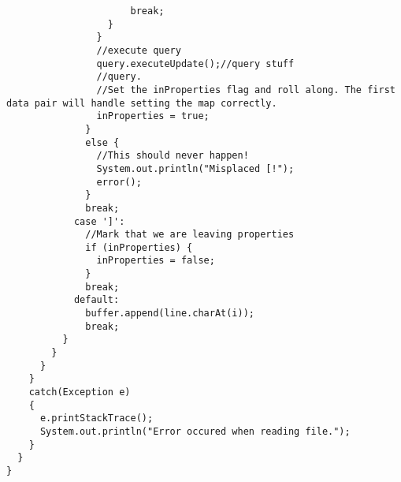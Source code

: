 \begin{lstlisting}
                      break;
                  }
                }
                //execute query
                query.executeUpdate();//query stuff
                //query.
                //Set the inProperties flag and roll along. The first data pair will handle setting the map correctly.
                inProperties = true;
              }
              else {
                //This should never happen!
                System.out.println("Misplaced [!");
                error();
              }
              break;
            case ']':
              //Mark that we are leaving properties
              if (inProperties) {
                inProperties = false;
              }
              break;
            default:
              buffer.append(line.charAt(i));
              break;
          }
        }
      }
    }
    catch(Exception e)
    {
      e.printStackTrace();
      System.out.println("Error occured when reading file.");
    }
  }
}

\end{lstlisting}

